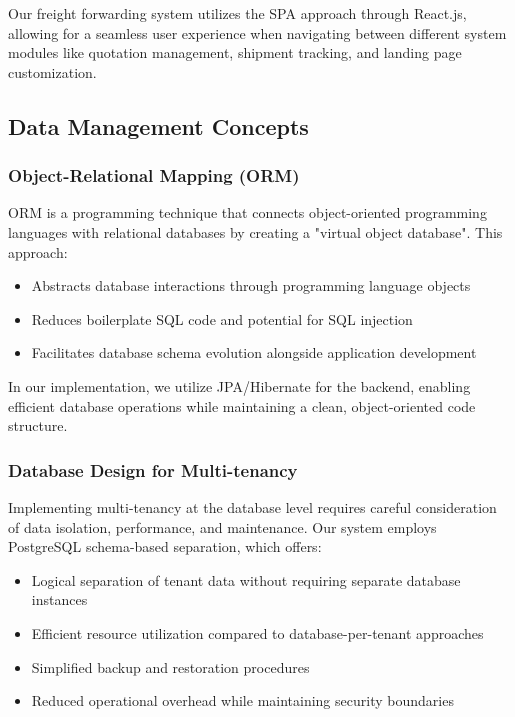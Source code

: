 Our freight forwarding system utilizes the SPA approach through React.js, allowing for a seamless user experience when navigating between different system modules like quotation management, shipment tracking, and landing page customization.

\subsection{Data Management Concepts}
\subsubsection{Object-Relational Mapping (ORM)}
ORM is a programming technique that connects object-oriented programming languages with relational databases by creating a "virtual object database". This approach:

\begin{itemize}
    \item Abstracts database interactions through programming language objects
    \item Reduces boilerplate SQL code and potential for SQL injection
    \item Facilitates database schema evolution alongside application development
\end{itemize}

In our implementation, we utilize JPA/Hibernate for the backend, enabling efficient database operations while maintaining a clean, object-oriented code structure.

\subsubsection{Database Design for Multi-tenancy}
Implementing multi-tenancy at the database level requires careful consideration of data isolation, performance, and maintenance. Our system employs PostgreSQL schema-based separation, which offers:

\begin{itemize}
    \item Logical separation of tenant data without requiring separate database instances
    \item Efficient resource utilization compared to database-per-tenant approaches
    \item Simplified backup and restoration procedures
    \item Reduced operational overhead while maintaining security boundaries
\end{itemize}

